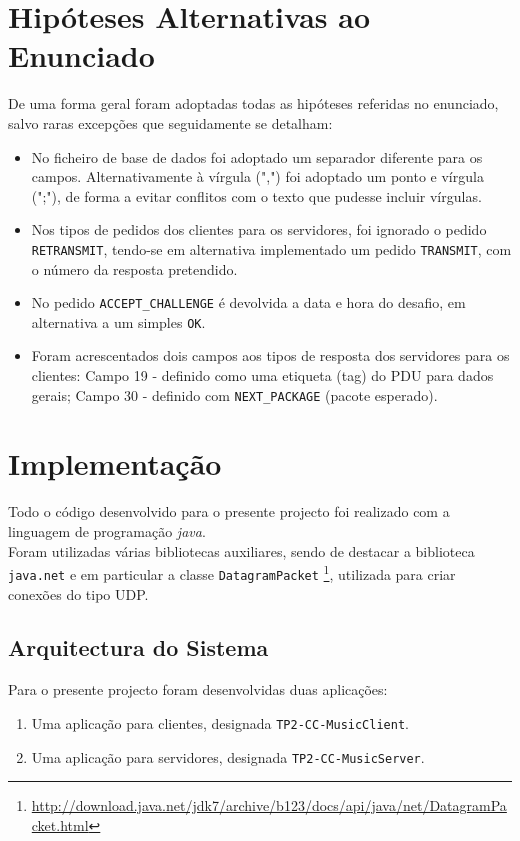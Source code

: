 \documentclass{llncs}
\begin{document}
\section{Hipóteses Alternativas ao Enunciado}
De uma forma geral foram adoptadas todas as hipóteses referidas no enunciado, 
salvo raras excepções que seguidamente se detalham:
\begin{itemize}
\item No ficheiro de base de dados foi adoptado um separador diferente para os campos. 
		Alternativamente à vírgula (",") foi adoptado um ponto e vírgula (";"), de forma a 
		evitar conflitos com o texto que pudesse incluir vírgulas.
\item Nos tipos de pedidos dos clientes para os servidores, foi ignorado o pedido 
		\verb!RETRANSMIT!, tendo-se em alternativa implementado um pedido \verb!TRANSMIT!, 
		com o número da resposta pretendido.
\item No pedido \verb!ACCEPT_CHALLENGE! é devolvida a data e hora do desafio, em alternativa 
		a um simples \verb!OK!.
\item Foram acrescentados dois campos aos tipos de resposta dos servidores para os clientes: 
		Campo 19 - definido como uma etiqueta (tag) do PDU para dados gerais;
		Campo 30 - definido com \verb!NEXT_PACKAGE! (pacote esperado).
\end{itemize}

\section{Implementação}
Todo o código desenvolvido para o presente projecto foi realizado com a linguagem de 
programação \emph{java}.\\

Foram utilizadas várias bibliotecas auxiliares, sendo de destacar a biblioteca 
\verb!java.net! e em particular a classe \verb!DatagramPacket! 
\footnote{\url{http://download.java.net/jdk7/archive/b123/docs/api/java/net/DatagramPacket.html}}, 
utilizada para criar conexões do tipo UDP.

\subsection{Arquitectura do Sistema}
Para o presente projecto foram desenvolvidas duas aplicações:
\begin{enumerate}
\item Uma aplicação para clientes, designada \verb!TP2-CC-MusicClient!.
\item Uma aplicação para servidores, designada \verb!TP2-CC-MusicServer!.
\end{enumerate}
\end{document}
